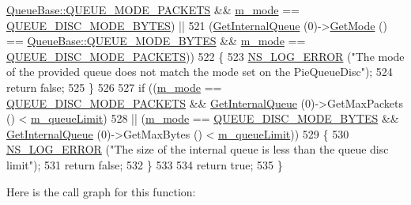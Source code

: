 \begin{DoxyCode}
      \hyperlink{classns3_1_1QueueBase_adc473162c2a2bcb3d76d151d6d7ee02aa68a809be7a09a4c4c7d8feb37f2f7a9d}{QueueBase::QUEUE\_MODE\_PACKETS} && \hyperlink{classns3_1_1PieQueueDisc_ad3e0fb992a133e8dcd1e0937a156ff2b}{m\_mode} == 
      \hyperlink{classns3_1_1PieQueueDisc_af026730ff1c04dd9bdf74b1797ae2ac4a7912e4d0abe5d772d04d327880734539}{QUEUE\_DISC\_MODE\_BYTES}) ||
521       (\hyperlink{classns3_1_1QueueDisc_adf09b498c07c5677c26ea4b8309def74}{GetInternalQueue} (0)->\hyperlink{classns3_1_1PieQueueDisc_a13bb54f830216e6d8e114abe3b4b04be}{GetMode} () == 
      \hyperlink{classns3_1_1QueueBase_adc473162c2a2bcb3d76d151d6d7ee02aa141eeb76bf0704ba0fdb23b04ffc3453}{QueueBase::QUEUE\_MODE\_BYTES} && \hyperlink{classns3_1_1PieQueueDisc_ad3e0fb992a133e8dcd1e0937a156ff2b}{m\_mode} == 
      \hyperlink{classns3_1_1PieQueueDisc_af026730ff1c04dd9bdf74b1797ae2ac4af556e8533dede431ff4553fe631883dc}{QUEUE\_DISC\_MODE\_PACKETS}))
522     \{
523       \hyperlink{group__logging_ga0261a8db1d4ac5f79417d117634fd455}{NS\_LOG\_ERROR} (\textcolor{stringliteral}{"The mode of the provided queue does not match the mode set on the
       PieQueueDisc"});
524       \textcolor{keywordflow}{return} \textcolor{keyword}{false};
525     \}
526 
527   \textcolor{keywordflow}{if} ((\hyperlink{classns3_1_1PieQueueDisc_ad3e0fb992a133e8dcd1e0937a156ff2b}{m\_mode} ==  \hyperlink{classns3_1_1PieQueueDisc_af026730ff1c04dd9bdf74b1797ae2ac4af556e8533dede431ff4553fe631883dc}{QUEUE\_DISC\_MODE\_PACKETS} && 
      \hyperlink{classns3_1_1QueueDisc_adf09b498c07c5677c26ea4b8309def74}{GetInternalQueue} (0)->GetMaxPackets () < \hyperlink{classns3_1_1PieQueueDisc_ad5a24ff6288913559429261d124db5eb}{m\_queueLimit})
528       || (\hyperlink{classns3_1_1PieQueueDisc_ad3e0fb992a133e8dcd1e0937a156ff2b}{m\_mode} ==  \hyperlink{classns3_1_1PieQueueDisc_af026730ff1c04dd9bdf74b1797ae2ac4a7912e4d0abe5d772d04d327880734539}{QUEUE\_DISC\_MODE\_BYTES} && 
      \hyperlink{classns3_1_1QueueDisc_adf09b498c07c5677c26ea4b8309def74}{GetInternalQueue} (0)->GetMaxBytes () < \hyperlink{classns3_1_1PieQueueDisc_ad5a24ff6288913559429261d124db5eb}{m\_queueLimit}))
529     \{
530       \hyperlink{group__logging_ga0261a8db1d4ac5f79417d117634fd455}{NS\_LOG\_ERROR} (\textcolor{stringliteral}{"The size of the internal queue is less than the queue disc limit"});
531       \textcolor{keywordflow}{return} \textcolor{keyword}{false};
532     \}
533 
534   \textcolor{keywordflow}{return} \textcolor{keyword}{true};
535 \}
\end{DoxyCode}


Here is the call graph for this function\+:


